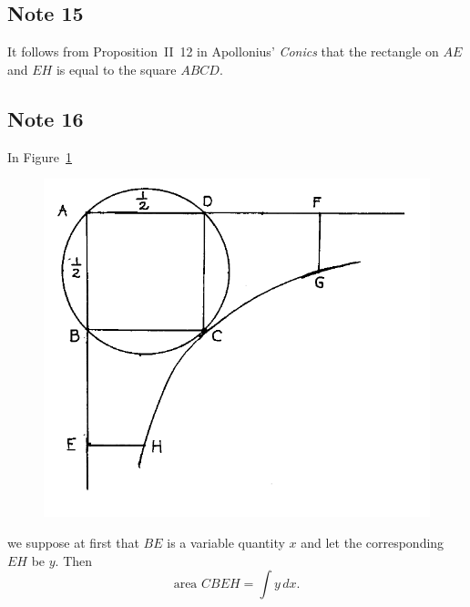 \documentclass[twoside,openright]{article}
\begin{document}
\subsection*{Note 15}
\label{ctp15}

It follows from Proposition~II~12 in Apollonius' {\em Conics} that the
rectangle on $AE$ and $EH$ is equal to the square $ABCD$.

\subsection*{Note 16}
\label{ctp16}

In Figure~\ref{harmony2}
\begin{figure}[htp]
  \begin{center}
    \includegraphics[width=.75\textwidth]{fig/Figure64}
    \caption{}
    \label{harmony2}
    \vspace{-10pt}
  \end{center}
\end{figure}
we suppose at first that $BE$ is a variable quantity $x$ and let the
corresponding $EH$ be $y$.  Then
$$\mbox{area }CBEH = \int\! y\,dx.$$
\end{document}
